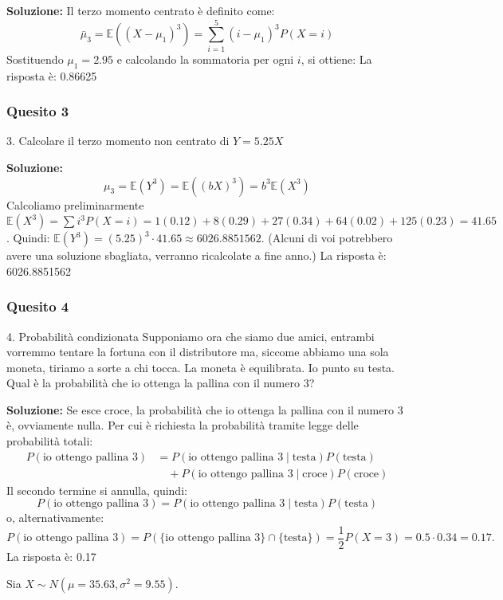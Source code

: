\documentclass[12pt, a4paper]{article}
\begin{document}
\textbf{Soluzione:}
Il terzo momento centrato è definito come:
$$ \bar{\mu}_3 = \mathbb{E}((X-\mu_1)^3) = \sum_{i=1}^5 (i-\mu_1)^3 P(X=i) $$
Sostituendo $\mu_1 = 2.95$ e calcolando la sommatoria per ogni $i$, si ottiene:
La risposta è: 0.86625

\subsubsection*{Quesito 3}
3. Calcolare il terzo momento non centrato di $Y=5.25X$

\textbf{Soluzione:}
$$ \mu_3 = \mathbb{E}(Y^3) = \mathbb{E}((bX)^3) = b^3 \mathbb{E}(X^3) $$
Calcoliamo preliminarmente $\mathbb{E}(X^3) = \sum i^3 P(X=i) = 1(0.12) + 8(0.29) + 27(0.34) + 64(0.02) + 125(0.23) = 41.65$.
Quindi: $\mathbb{E}(Y^3) = (5.25)^3 \cdot 41.65 \approx 6026.8851562$.
(Alcuni di voi potrebbero avere una soluzione sbagliata, verranno ricalcolate a fine anno.)
La risposta è: 6026.8851562

\newpage

\subsubsection*{Quesito 4}
4. Probabilità condizionata
Supponiamo ora che siamo due amici, entrambi vorremmo tentare la fortuna con il distributore ma, siccome abbiamo una sola moneta, tiriamo a sorte a chi tocca. La moneta è equilibrata. Io punto su testa. Qual è la probabilità che io ottenga la pallina con il numero 3?

\textbf{Soluzione:}
Se esce croce, la probabilità che io ottenga la pallina con il numero 3 è, ovviamente nulla. Per cui è richiesta la probabilità tramite legge delle probabilità totali:
$$ \begin{aligned} P(\text{io ottengo pallina } 3) &= P(\text{io ottengo pallina } 3 \mid \text{testa})P(\text{testa}) \\ &\quad + P(\text{io ottengo pallina } 3 \mid \text{croce})P(\text{croce}) \end{aligned} $$
Il secondo termine si annulla, quindi:
$$ P(\text{io ottengo pallina } 3) = P(\text{io ottengo pallina } 3 \mid \text{testa})P(\text{testa}) $$
o, alternativamente:
$$ P(\text{io ottengo pallina } 3) = P(\{\text{io ottengo pallina } 3\} \cap \{\text{testa}\}) = \frac{1}{2} P(X=3) = 0.5 \cdot 0.34 = 0.17. $$
La risposta è: 0.17


\vspace{0.5cm}
\begin{tcolorbox}[colback=lightergray!10, colframe=tocsec, title=\textbf{Esercizio 9}]
Sia $X \sim N(\mu=35.63, \sigma^2=9.55)$.
\end{tcolorbox}
\end{document}
